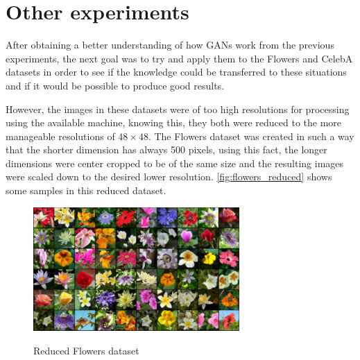 \section{Other experiments}
After obtaining a better understanding of how \acp{GAN} work from the previous experiments, the next goal was to try and apply them to the Flowers and CelebA datasets in order to see if the knowledge could be transferred to these situations and if it would be possible to produce good results.

However, the images in these datasets were of too high resolutions for processing using the available machine, knowing this, they both were reduced to the more manageable resolutions of $48\times48$. The Flowers dataset was created in such a way that the shorter dimension has always 500 pixels, using this fact, the longer dimensions were center cropped to be of the same size and the resulting images were scaled down to the desired lower resolution. \autoref{fig:flowers_reduced} shows some samples in this reduced dataset.
\begin{figure}[hbt]
    \centering
    \caption{Reduced Flowers dataset}
    \includegraphics[width=0.7\textwidth]{chapters/Experiments/Other/Flowers_reduced.pdf}
    \label{fig:flowers_reduced}
\end{figure}

